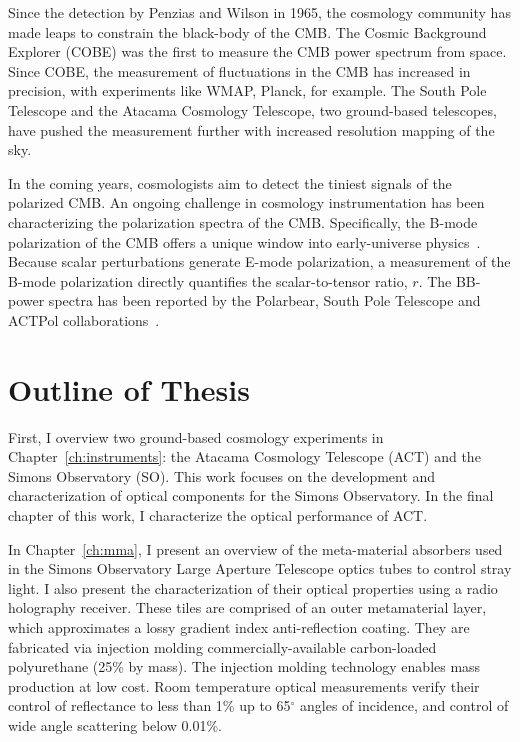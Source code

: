 Since the detection by Penzias and Wilson in 1965, the cosmology community has made leaps to constrain the black-body of the CMB.  The Cosmic Background Explorer (COBE) was the first to measure the CMB power spectrum from space.  Since COBE, the measurement of fluctuations in the CMB has increased in precision, with experiments like WMAP, Planck, for example.  The South Pole Telescope and the Atacama Cosmology Telescope, two ground-based telescopes, have pushed the measurement further with increased resolution mapping of the sky.

In the coming years, cosmologists aim to detect the tiniest signals of the polarized CMB.  An ongoing challenge in cosmology instrumentation has been characterizing the polarization spectra of the CMB.  Specifically, the B-mode polarization of the CMB offers a unique window into early-universe physics~\cite{weinberg_cosmo}.  Because scalar perturbations generate E-mode polarization, a measurement of the B-mode polarization directly quantifies the scalar-to-tensor ratio, $r$.  The BB-power spectra has been reported by the Polarbear, South Pole Telescope and ACTPol collaborations~\cite{planck_data,choi_2020,PARAde_2014}.

\section{Outline of Thesis}

First, I overview two ground-based cosmology experiments in Chapter~\ref{ch:instruments}: the Atacama Cosmology Telescope (ACT) and the Simons Observatory (SO).  This work focuses on the development and characterization of optical components for the Simons Observatory.  In the final chapter of this work, I characterize the optical performance of ACT.

In Chapter~\ref{ch:mma}, I present an overview of the meta-material absorbers used in the Simons Observatory Large Aperture Telescope optics tubes to control stray light.  I also present the characterization of their optical properties using a radio holography receiver.  These tiles are comprised of an outer metamaterial layer, which approximates a lossy gradient index anti-reflection coating. They are fabricated via injection molding commercially-available carbon-loaded polyurethane (25\% by mass). The injection molding technology enables mass production at low cost.  Room temperature optical measurements verify their control of reflectance to less than 1\% up to 65$^{\circ}$ angles of incidence, and control of wide angle scattering below 0.01\%.

